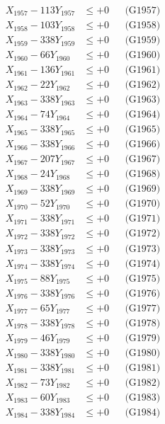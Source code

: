 \documentclass[a4paper,10pt]{article}
\begin{document}
{\begin{align}
X_{1957} - 113Y_{1957} &\leq +0 && \text{(G1957)} \\
X_{1958} - 103Y_{1958} &\leq +0 && \text{(G1958)} \\
X_{1959} - 338Y_{1959} &\leq +0 && \text{(G1959)} \\
X_{1960} - 66Y_{1960} &\leq +0 && \text{(G1960)} \\
\allowbreak
X_{1961} - 136Y_{1961} &\leq +0 && \text{(G1961)} \\
X_{1962} - 22Y_{1962} &\leq +0 && \text{(G1962)} \\
X_{1963} - 338Y_{1963} &\leq +0 && \text{(G1963)} \\
X_{1964} - 74Y_{1964} &\leq +0 && \text{(G1964)} \\
X_{1965} - 338Y_{1965} &\leq +0 && \text{(G1965)} \\
X_{1966} - 338Y_{1966} &\leq +0 && \text{(G1966)} \\
X_{1967} - 207Y_{1967} &\leq +0 && \text{(G1967)} \\
X_{1968} - 24Y_{1968} &\leq +0 && \text{(G1968)} \\
X_{1969} - 338Y_{1969} &\leq +0 && \text{(G1969)} \\
X_{1970} - 52Y_{1970} &\leq +0 && \text{(G1970)} \\
\allowbreak
X_{1971} - 338Y_{1971} &\leq +0 && \text{(G1971)} \\
X_{1972} - 338Y_{1972} &\leq +0 && \text{(G1972)} \\
X_{1973} - 338Y_{1973} &\leq +0 && \text{(G1973)} \\
X_{1974} - 338Y_{1974} &\leq +0 && \text{(G1974)} \\
X_{1975} - 88Y_{1975} &\leq +0 && \text{(G1975)} \\
X_{1976} - 338Y_{1976} &\leq +0 && \text{(G1976)} \\
X_{1977} - 65Y_{1977} &\leq +0 && \text{(G1977)} \\
X_{1978} - 338Y_{1978} &\leq +0 && \text{(G1978)} \\
X_{1979} - 46Y_{1979} &\leq +0 && \text{(G1979)} \\
X_{1980} - 338Y_{1980} &\leq +0 && \text{(G1980)} \\
\allowbreak
X_{1981} - 338Y_{1981} &\leq +0 && \text{(G1981)} \\
X_{1982} - 73Y_{1982} &\leq +0 && \text{(G1982)} \\
X_{1983} - 60Y_{1983} &\leq +0 && \text{(G1983)} \\
X_{1984} - 338Y_{1984} &\leq +0 && \text{(G1984)} \\

\end{align}}
\end{document}
